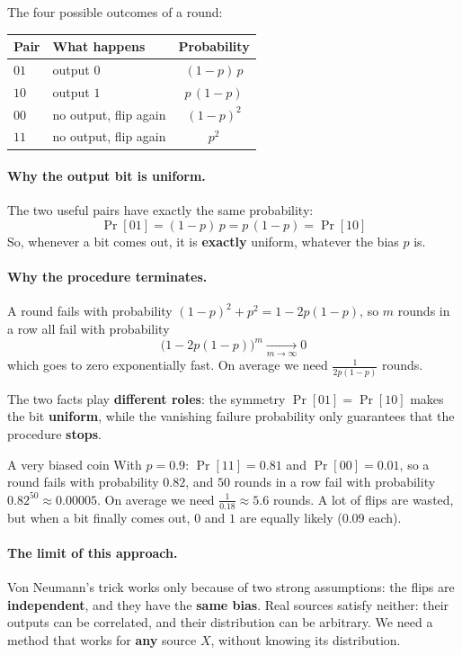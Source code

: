 The four possible outcomes of a round:

\begin{table}[H]
  \centering
  \small
  \begin{tabular}{llc}
    \toprule
    \textbf{Pair} & \textbf{What happens} & \textbf{Probability} \\
    \midrule
    $01$ & output $0$ & $(1-p)\,p$ \\
    $10$ & output $1$ & $p\,(1-p)$ \\
    $00$ & no output, flip again & $(1-p)^2$ \\
    $11$ & no output, flip again & $p^2$ \\
    \bottomrule
  \end{tabular}
\end{table}

\paragraph{Why the output bit is uniform.} The two useful pairs have exactly the same probability:
\[
  \Pr[01] = (1-p)\,p = p\,(1-p) = \Pr[10]
\]
So, whenever a bit comes out, it is \textbf{exactly} uniform, whatever the bias $p$ is.

\paragraph{Why the procedure terminates.} A round fails with probability $(1-p)^2 + p^2 = 1 - 2p(1-p)$, so $m$ rounds in a row all fail with probability
\[
  \big(1 - 2p(1-p)\big)^m \xrightarrow[m \to \infty]{} 0
\]
which goes to zero exponentially fast. On average we need $\frac{1}{2p(1-p)}$ rounds.

The two facts play \textbf{different roles}: the symmetry $\Pr[01] = \Pr[10]$ makes the bit \textbf{uniform}, while the vanishing failure probability only guarantees that the procedure \textbf{stops}.

\begin{framedex}{A very biased coin}
  With $p = 0.9$: $\Pr[11] = 0.81$ and $\Pr[00] = 0.01$, so a round fails with probability $0.82$, and $50$ rounds in a row fail with probability $0.82^{50} \approx 0.00005$. On average we need $\frac{1}{0.18} \approx 5.6$ rounds. A lot of flips are wasted, but when a bit finally comes out, $0$ and $1$ are equally likely ($0.09$ each).
\end{framedex}

\paragraph{The limit of this approach.} Von Neumann's trick works only because of two strong assumptions: the flips are \textbf{independent}, and they have the \textbf{same bias}. Real sources satisfy neither: their outputs can be correlated, and their distribution can be arbitrary. We need a method that works for \textbf{any} source $X$, without knowing its distribution.

